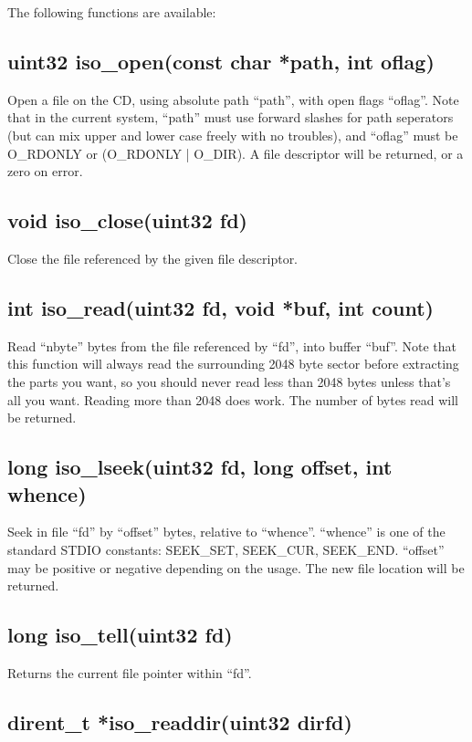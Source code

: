\documentclass[english]{report}
\begin{document}
The following functions are available:


\subsection{uint32 iso\_open(const char *path, int oflag)}

Open a file on the CD, using absolute path ``path'', with open
flags ``oflag''. Note that in the current system, ``path''
must use forward slashes for path seperators (but can mix upper and
lower case freely with no troubles), and ``oflag'' must be O\_RDONLY
or (O\_RDONLY | O\_DIR). A file descriptor will be returned, or a
zero on error.


\subsection{void iso\_close(uint32 fd)}

Close the file referenced by the given file descriptor.


\subsection{int iso\_read(uint32 fd, void *buf, int count)}

Read ``nbyte'' bytes from the file referenced by ``fd'', into
buffer ``buf''. Note that this function will always read the surrounding
2048 byte sector before extracting the parts you want, so you should
never read less than 2048 bytes unless that's all you want. Reading
more than 2048 does work. The number of bytes read will be returned.


\subsection{long iso\_lseek(uint32 fd, long offset, int whence)}

Seek in file ``fd'' by ``offset'' bytes, relative to ``whence''.
``whence'' is one of the standard STDIO constants: SEEK\_SET,
SEEK\_CUR, SEEK\_END. ``offset'' may be positive or negative depending
on the usage. The new file location will be returned.


\subsection{long iso\_tell(uint32 fd)}

Returns the current file pointer within ``fd''.


\subsection{dirent\_t *iso\_readdir(uint32 dirfd)}
\end{document}
